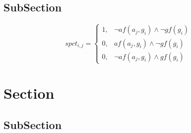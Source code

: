 \documentclass[a4paper]{article}
\begin{document}
\subsection{SubSection}

\begin{equation}
spct_{i,j} =
\begin{cases}
1, & \text{$\neg af(a_j,g_i) \wedge \neg gf(g_i)$}\\
0, & \text{$af(a_j,g_i) \wedge \neg gf(g_i)$}\\
0, & \text{$\neg af(a_j,g_i) \wedge gf(g_i)$}
\end{cases}
\end{equation}

\section{Section}

\subsection{SubSection}
\end{document}

